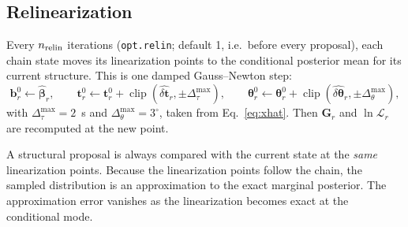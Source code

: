 \documentclass[11pt]{article}
\newcommand{\clip}{\operatorname{clip}}
\begin{document}
\subsection{Relinearization}\label{sec:relin}
Every $n_{\rm relin}$ iterations (\texttt{opt.relin}; default 1, i.e.\
before every proposal), each chain state moves its linearization points to
the conditional posterior mean for its current structure. This is one
damped Gauss--Newton step:
\begin{equation}\label{eq:relin}
 \mathbf{b}^0_r\leftarrow\hat{\bm\beta}_r,\qquad
 \mathbf{t}^0_r\leftarrow\mathbf{t}^0_r+\clip(\widehat{\delta\mathbf{t}}_r,\pm\Delta_\tau^{\max}),\qquad
 \bm\theta^0_r\leftarrow\bm\theta^0_r+\clip(\widehat{\delta\bm\theta}_r,\pm\Delta_\theta^{\max}),
\end{equation}
with $\Delta_\tau^{\max}=2$~s and $\Delta_\theta^{\max}=3^\circ$, taken from
Eq.~\eqref{eq:xhat}. Then $\mathbf{G}_r$ and $\ln\mathcal{L}_r$ are
recomputed at the new point.

A structural proposal is always compared with the current state at the
\emph{same} linearization points. Because the linearization points follow
the chain, the sampled distribution is an approximation to the exact
marginal posterior. The approximation error vanishes as the linearization
becomes exact at the conditional mode.
\end{document}
